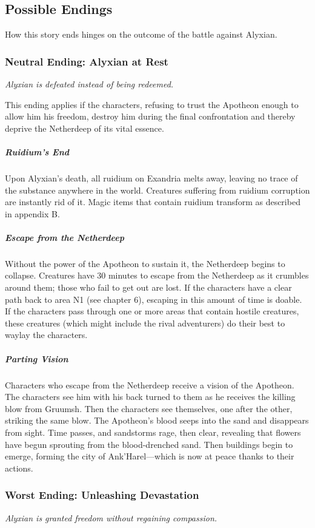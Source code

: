 \documentclass[10pt,a4paper,twoside,bg=print,twocolumn,openany,nodeprecatedcode]{dndbook}
\begin{document}
\subsection{Possible Endings}
How this story ends hinges on the outcome of the battle against Alyxian.

\subsubsection{Neutral Ending: Alyxian at Rest}
\textit{Alyxian is defeated instead of being redeemed.}

This ending applies if the characters, refusing to trust the Apotheon enough to allow him his freedom, destroy him during the final confrontation and thereby deprive the Netherdeep of its vital essence.

\subparagraph{Ruidium's End}
Upon Alyxian's death, all ruidium on Exandria melts away, leaving no trace of the substance anywhere in the world. Creatures suffering from ruidium corruption are instantly rid of it. Magic items that contain ruidium transform as described in appendix B.

\subparagraph{Escape from the Netherdeep}
Without the power of the Apotheon to sustain it, the Netherdeep begins to collapse. Creatures have 30 minutes to escape from the Netherdeep as it crumbles around them; those who fail to get out are lost. If the characters have a clear path back to area N1 (see chapter 6), escaping in this amount of time is doable. If the characters pass through one or more areas that contain hostile creatures, these creatures (which might include the rival adventurers) do their best to waylay the characters.

\subparagraph{Parting Vision}
Characters who escape from the Netherdeep receive a vision of the Apotheon. The characters see him with his back turned to them as he receives the killing blow from Gruumsh. Then the characters see themselves, one after the other, striking the same blow. The Apotheon's blood seeps into the sand and disappears from sight. Time passes, and sandstorms rage, then clear, revealing that flowers have begun sprouting from the blood-drenched sand. Then buildings begin to emerge, forming the city of Ank'Harel—which is now at peace thanks to their actions.

\subsubsection{Worst Ending: Unleashing Devastation}
\textit{Alyxian is granted freedom without regaining compassion.}
\end{document}
